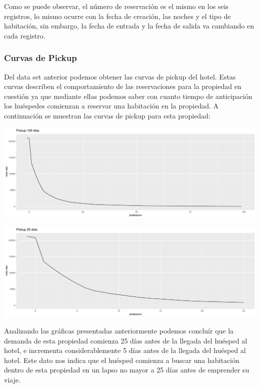 Como se puede observar, el número de reservación es el mismo en los seis registros, lo mismo ocurre con la fecha de creación, las noches y el tipo de habitación, sin embargo, la fecha de entrada y la fecha de salida va cambiando en cada registro.

\subsubsection*{Curvas de Pickup}

Del data set anterior podemos obtener las curvas de pickup del hotel. Estas curvas describen el comportamiento de las reservaciones para la propiedad en cuestión ya que mediante ellas podemos saber con cuanto tiempo de anticipación los huéspedes comienzan a reservar una habitación en la propiedad. A continuación se muestran las curvas de pickup para esta propiedad:

\color{fgcolor}
\includegraphics[width=\maxwidth]{Figures/pickup-1} 

\color{fgcolor}
\includegraphics[width=\maxwidth]{figures/pickupzoom-1} 

Analizando las gráficas presentadas anteriormente podemos concluír que la demanda de esta propiedad comienza 25 días antes de la llegada del huésped al hotel, e incrementa considerablemente 5 días antes de la llegada del huésped al hotel. Este dato nos indica que el huésped comienza a buscar una habitación dentro de esta propiedad en un lapso no mayor a 25 días antes de emprender su viaje.


